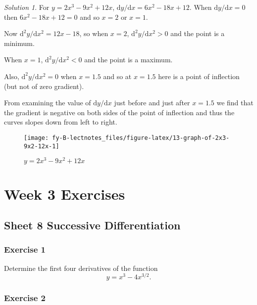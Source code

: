 \documentclass[
  english,
  11pt,
  oneside]{book}
\newcommand{\slide}{}
\theoremstyle{definition}
\theoremstyle{definition}
\theoremstyle{definition}
\theoremstyle{definition}
\theoremstyle{remark}
\newtheorem*{solution}{Solution}
\begin{document}
\begin{solution}

For \(y = 2x^3-9x^2+12x\), \(\mathrm{d}y/\mathrm{d} x = 6x^2-18x+12\). When \(\mathrm{d}y/\mathrm{d} x=0\) then \(6x^2-18x+12=0\) and so \(x=2\) or \(x=1\).

Now \(\mathrm{d}^{2}y/\mathrm{d} x^2 = 12x-18\), so when \(x=2\), \(\mathrm{d}^{2}y/\mathrm{d} x^2>0\) and the point is a minimum.

When \(x=1\), \(\mathrm{d}^{2}y/\mathrm{d} x^2<0\) and the point is a maximum.

Also, \(\mathrm{d}^{2}y/\mathrm{d} x^2=0\) when \(x=1.5\) and so at \(x=1.5\) here is a point of inflection (but not of zero gradient).

From examining the value of \(\mathrm{d}y/\mathrm{d} x\) just before and just after \(x=1.5\) we find that the gradient is negative on both sides of the point of inflection and thus the curves slopes down from left to right.

\begin{figure}

{\centering \texttt{[image: fy-B-lectnotes\_files/figure-latex/13-graph-of-2x3-9x2-12x-1]} 

}

\caption{$y = 2x^3-9x^2+12x$}\label{fig:13-graph-of-2x3-9x2-12x}
\end{figure}

\end{solution}

\chapter*{Week 3 Exercises}\label{week-3-exercises}

\section{Sheet 8 Successive Differentiation}\label{sheet-8-successive-differentiation}

\subsection*{Exercise 1}\label{exercise-1-2}

Determine the first four derivatives of the function
\[
y=x^3-4x^{3/2}.
\]
\slide

\subsection*{Exercise 2}\label{exercise-2-2}
\end{document}
